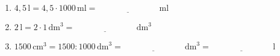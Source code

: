 \begin{enumerate}[label=\arabic*.]
\begin{enumerate}[label=\alph*)]
        \vspace{0.5cm}

        \item $4{,}5\,\text{l} = 4{,}5 \cdot 1000\,\text{ml} = \underline{\hspace{3cm}}\,\text{ml}$

        \vspace{0.5cm}

        \item $2\,\text{l} = 2 \cdot 1\,\text{dm}^3 = \underline{\hspace{3cm}}\,\text{dm}^3$

        \vspace{0.5cm}

        \item $1500\,\text{cm}^3 = 1500 : 1000\,\text{dm}^3 = \underline{\hspace{3cm}}\,\text{dm}^3 = \underline{\hspace{3cm}}\,\text{l}$
    \end{enumerate}
\end{enumerate}